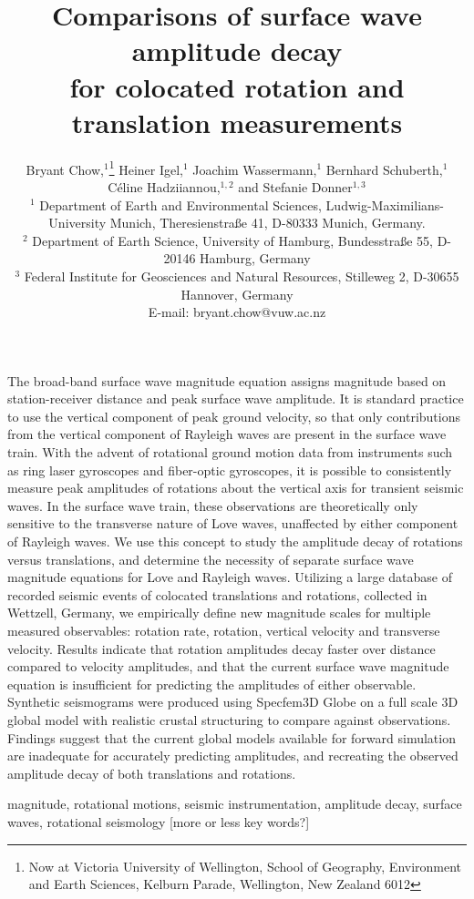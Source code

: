 \documentclass{gji}
\title[Comparisons of surface wave amplitude decay]
  {Comparisons of surface wave amplitude decay \\for colocated rotation and translation measurements}
\author[Bryant Chow]
  {Bryant Chow,$^1$\thanks{Now at Victoria University of Wellington, School of Geography, Environment and Earth Sciences, Kelburn Parade, Wellington, New Zealand 6012} 
  Heiner Igel,$^1$ 
  Joachim Wassermann,$^1$
  Bernhard Schuberth,$^1$  \vspace{2mm}\\
  \LARGE{{\normalfont C\' eline Hadziiannou,$^{1,2}$ and
  Stefanie Donner$^{1,3}$}}\vspace{2mm}\\
  $^1$ Department of Earth and Environmental Sciences, Ludwig-Maximilians-University Munich, Theresienstra\ss e 41, D-80333 Munich, Germany.\\
  $^2$ Department of Earth Science, University of Hamburg, Bundesstra\ss e 55, D-20146 Hamburg, Germany\\
  $^3$ Federal Institute for Geosciences and Natural Resources, Stilleweg 2, D-30655 Hannover, Germany \\E-mail: bryant.chow@vuw.ac.nz
  }
\date{}
\begin{document}
\label{firstpage}

\maketitle

\begin{summary}
The broad-band surface wave magnitude equation assigns magnitude based on station-receiver distance and peak surface wave amplitude. It is standard practice to use the vertical component of peak ground velocity, so that only contributions from the vertical component of Rayleigh waves are present in the surface wave train. With the advent of rotational ground motion data from instruments such as ring laser gyroscopes and fiber-optic gyroscopes, it is possible to consistently measure peak amplitudes of rotations about the vertical axis for transient seismic waves. In the surface wave train, these observations are theoretically only sensitive to the transverse nature of Love waves, unaffected by either component of Rayleigh waves. We use this concept to study the amplitude decay of rotations versus translations, and determine the necessity of separate surface wave magnitude equations for Love and Rayleigh waves. Utilizing a large database of recorded seismic events of colocated translations and rotations, collected in Wettzell, Germany, we empirically define new magnitude scales for multiple measured observables: rotation rate, rotation, vertical velocity and transverse velocity. Results indicate that rotation amplitudes decay faster over distance compared to velocity amplitudes, and that the current surface wave magnitude equation is insufficient for predicting the amplitudes of either observable. Synthetic seismograms were produced using Specfem3D Globe on a full scale 3D global model with realistic crustal structuring to compare against observations. Findings suggest that the current global models available for forward simulation are inadequate for accurately predicting amplitudes, and recreating the observed amplitude decay of both translations and rotations.
\end{summary}

\begin{keywords}
magnitude, rotational motions, seismic instrumentation, amplitude decay, surface waves, rotational seismology [more or less key words?]
\end{keywords}
\end{document}
